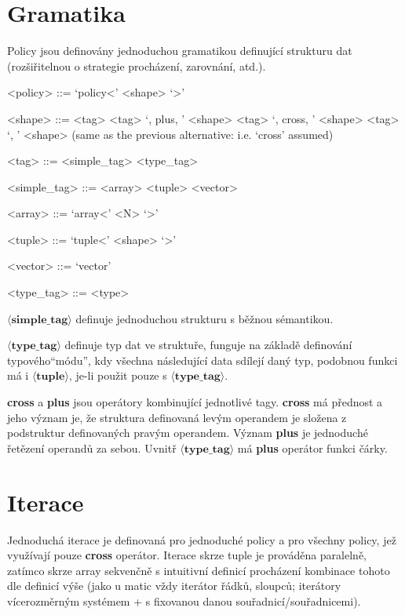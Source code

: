 \documentclass[a4paper,12pt]{article}
\begin{document}
    \section{Gramatika}

    Policy jsou definovány jednoduchou gramatikou definující strukturu dat (rozšiřitelnou o strategie procházení, zarovnání, atd.).

    \begin{grammar}
        <policy> ::= `policy<' <shape> `>'

        <shape> ::= <tag>
        \alt <tag> `, plus, ' <shape>
        \alt <tag> `, cross, ' <shape>
        \alt <tag> `, ' <shape> (same as the previous alternative: i.e. `cross' assumed)

        <tag> ::= <simple_tag>
        \alt <type_tag>

        <simple_tag> ::= <array>
        \alt <tuple>
        \alt <vector>

        <array> ::= `array<' <N> `>'

        <tuple> ::= `tuple<' <shape> `>'

        <vector> ::= `vector'

        <type_tag> ::= <type>
    \end{grammar}

    $\mathbf{\langle simple\_tag \rangle}$ definuje jednoduchou strukturu s běžnou sémantikou.

    $\mathbf{\langle type\_tag \rangle}$ definuje typ dat ve struktuře, funguje na základě definování typového\linebreak``módu'', kdy všechna následující data sdílejí daný typ, podobnou funkci má i $\mathbf{\langle tuple \rangle}$, je-li použit pouze s $\mathbf{\langle type\_tag \rangle}$.

    \textbf{cross} a \textbf{plus} jsou operátory kombinující jednotlivé tagy.
    \textbf{cross} má přednost a jeho význam je, že struktura definovaná levým operandem je složena z podstruktur definovaných pravým operandem. Význam \textbf{plus} je jednoduché řetězení operandů za sebou. Uvnitř $\mathbf{\langle type\_tag \rangle}$ má \textbf{plus} operátor funkci čárky.

    \section{Iterace}

    Jednoduchá iterace je definovaná pro jednoduché policy a pro všechny policy, jež využívají pouze \textbf{cross} operátor. Iterace skrze tuple je prováděna paralelně, zatímco skrze array sekvenčně s intuitivní definicí procházení kombinace tohoto dle definicí výše (jako u matic vždy iterátor řádků, sloupců; iterátory vícerozměrným systémem + s fixovanou danou souřadnicí/souřadnicemi).
\end{document}
